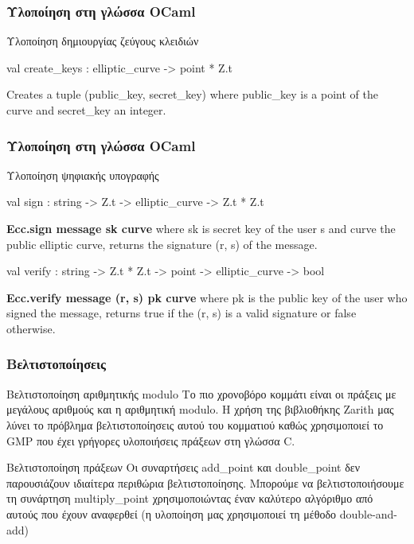 \documentclass{beamer}
\begin{document}
%
\begin{frame}
\frametitle{Υλοποίηση στη γλώσσα OCaml}
\begin{block}
{Υλοποίηση δημιουργίας ζεύγους κλειδιών}
\label{val:Ecc.Ecc.create-underscorekeys}\begin{ocamldoccode}
val create\_keys : elliptic\_curve -> point * Z.t
\end{ocamldoccode}
\begin{ocamldocdescription}
Creates a tuple (public\_key, secret\_key) where public\_key is a point of the curve and secret\_key an integer.
\end{ocamldocdescription}
\end{block}
\end{frame}


%
\begin{frame}
\frametitle{Υλοποίηση στη γλώσσα OCaml}
\begin{block}
{Υλοποίηση ψηφιακής υπογραφής}
\label{val:Ecc.Ecc.sign}\begin{ocamldoccode}
val sign : string -> Z.t -> elliptic\_curve -> Z.t * Z.t
\end{ocamldoccode}
\begin{ocamldocdescription}
\textbf{Ecc.sign message sk curve} where sk is secret key of the user s and curve  the public elliptic curve, returns the signature (r, s) of the message.


\end{ocamldocdescription}


\label{val:Ecc.Ecc.verify}\begin{ocamldoccode}
val verify : string -> Z.t * Z.t -> point -> elliptic\_curve -> bool
\end{ocamldoccode}
\begin{ocamldocdescription}
\textbf{Ecc.verify message (r, s) pk curve} where pk is the public key of the user who signed the message, returns true if the (r, s) is a valid signature or false otherwise.
\end{ocamldocdescription}

\end{block}
\end{frame}



%
\begin{frame}
\frametitle{Βελτιστοποίησεις}
\begin{block}
{Βελτιστοποίηση αριθμητικής modulo}
Το πιο χρονοβόρο κομμάτι είναι οι πράξεις με μεγάλους αριθμούς και η αριθμητική modulo. Η χρήση της βιβλιοθήκης Zarith μας λύνει το πρόβλημα βελτιστοποίησεις αυτού του κομματιού καθώς χρησιμοποιεί το GMP που έχει γρήγορες υλοποιήσεις πράξεων στη γλώσσα C.
\end{block}
\begin{block}
{Βελτιστοποίηση πράξεων}
Οι συναρτήσεις add\_point και double\_point δεν παρουσιάζουν ιδιαίτερα περιθώρια βελτιστοποίησης. Μπορούμε να βελτιστοποιήσουμε τη συνάρτηση multiply\_point χρησιμοποιώντας έναν καλύτερο αλγόριθμο από αυτούς που έχουν αναφερθεί (η υλοποίηση μας χρησιμοποιεί τη μέθοδο double-and-add)
\end{block}
\end{frame}
\end{document}
